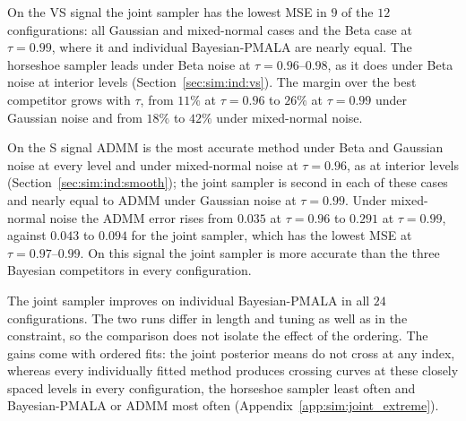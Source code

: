 On the VS signal the joint sampler has the lowest MSE in $9$ of the $12$ configurations: all Gaussian and mixed-normal cases and the Beta case at $\tau=0.99$, where it and individual Bayesian-PMALA are nearly equal. The horseshoe sampler leads under Beta noise at $\tau=0.96$--$0.98$, as it does under Beta noise at interior levels (Section~\ref{sec:sim:ind:vs}). The margin over the best competitor grows with $\tau$, from $11\%$ at $\tau=0.96$ to $26\%$ at $\tau=0.99$ under Gaussian noise and from $18\%$ to $42\%$ under mixed-normal noise.

On the S signal ADMM is the most accurate method under Beta and Gaussian noise at every level and under mixed-normal noise at $\tau=0.96$, as at interior levels (Section~\ref{sec:sim:ind:smooth}); the joint sampler is second in each of these cases and nearly equal to ADMM under Gaussian noise at $\tau=0.99$. Under mixed-normal noise the ADMM error rises from $0.035$ at $\tau=0.96$ to $0.291$ at $\tau=0.99$, against $0.043$ to $0.094$ for the joint sampler, which has the lowest MSE at $\tau=0.97$--$0.99$. On this signal the joint sampler is more accurate than the three Bayesian competitors in every configuration.

The joint sampler improves on individual Bayesian-PMALA in all $24$ configurations. The two runs differ in length and tuning as well as in the constraint, so the comparison does not isolate the effect of the ordering. The gains come with ordered fits: the joint posterior means do not cross at any index, whereas every individually fitted method produces crossing curves at these closely spaced levels in every configuration, the horseshoe sampler least often and Bayesian-PMALA or ADMM most often (Appendix~\ref{app:sim:joint_extreme}).


